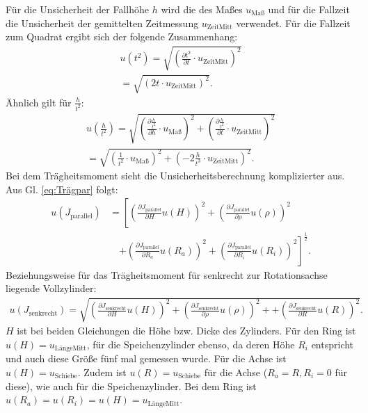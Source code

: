 \documentclass[11pt,a4paper,titlepage, ngerman]{article}
\begin{document}
	Für die Unsicherheit der Fallhöhe $h$ wird die des Maßes $u_\text{Maß}$ und für die Fallzeit die Unsicherheit der gemittelten Zeitmessung $u_\text{ZeitMitt}$ verwendet. Für die Fallzeit zum Quadrat ergibt sich der folgende Zusammenhang:
	\begin{align*}
		u(t^2) = \sqrt{\left( \frac{\partial t^2}{\partial t}\cdot u_\text{ZeitMitt}\right) ^2}\\
			   = \sqrt{\left( 2 t\cdot u_\text{ZeitMitt}\right) ^2}.
	\end{align*}
	Ähnlich gilt für $\frac{h}{t^2}$:
	\begin{align*}
		u\left( \frac{h}{t^2}\right) = \sqrt{\left( \frac{\partial \frac{h}{t^2}}{\partial h}\cdot u_\text{Maß}\right) ^2 + \left( \frac{\partial \frac{h}{t^2}}{\partial t}\cdot u_\text{ZeitMitt}\right) ^2}\\
		= \sqrt{\left( \frac{1}{t^2}\cdot u_\text{Maß} \right) ^2 + \left(-2 \frac{h}{t^3}\cdot u_\text{ZeitMitt} \right) ^2}.
	\end{align*}
	Bei dem Trägheitsmoment sieht die Unsicherheitsberechnung komplizierter aus. Aus Gl. \ref{eq:Trägpar} folgt:
	\begin{align*}
		u(J_\text{parallel}) &= 
		\left[\left( \frac{\partial J_\text{parallel}}{\partial H}u(H)\right)^2  				
			+ \left( \frac{\partial J_\text{parallel}}{\partial \rho}u(\rho)\right)^2 \right.\\ 
			&\quad\left.+ \left( \frac{\partial J_\text{parallel}}{\partial R_a}u(R_a)\right)^2 
			+ \left( \frac{\partial J_\text{parallel}}{\partial R_i}u(R_i)\right)^2\right]^{\frac{1}{2}}.			 
	\end{align*}
	Beziehungsweise für das Trägheitsmoment für senkrecht zur Rotationsachse liegende Vollzylinder:
	\begin{align*}
		u(J_\text{senkrecht}) = \sqrt{\left( \frac{\partial J_\text{senkrecht}}{\partial H}u(H)\right)^2 				
			+ \left( \frac{\partial J_\text{senkrecht}}{\partial \rho}u(\rho)\right)^2 + 
			+ \left( \frac{\partial J_\text{senkrecht}}{\partial R}u(R)\right)^2}.			 
	\end{align*}
	$H$ ist bei beiden Gleichungen die Höhe bzw. Dicke des Zylinders. Für den Ring ist $u(H) =  u_\text{LängeMitt}$, für die Speichenzylinder ebenso, da deren Höhe $R_i$ entspricht und auch diese Größe fünf mal gemessen wurde. Für die Achse ist $u(H) =  u_\text{Schiebe}$. Zudem ist $u(R) = u_\text{Schiebe}$ für die Achse ($R_a = R, R_i = 0$ für diese), wie auch für die Speichenzylinder. Bei dem Ring ist $u(R_a) = u(R_i) = u(H) = u_\text{LängeMitt}$.
\end{document}

